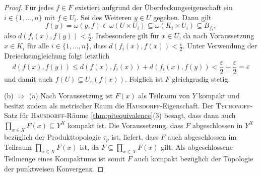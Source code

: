 \begin{proof}
  Für jedes $f \in F$ existiert aufgrund der Überdeckungseigenschaft ein $i \in \{ 1,\dots,n\}$ mit $f \in U_i$.
  Sei des Weiteren $y \in U$ gegeben.
  Dann gilt
  \begin{displaymath}
    f(y) = \omega(y,f) \in \omega(U \times U_i) \subseteq \omega(K_i \times U_i) \subseteq B_{f_i},
  \end{displaymath}
  also $d(f_i(x),f(y)) < \tfrac{\varepsilon}{2}$.
  Insbesondere gilt für $x \in U$, da nach Voraussetzung $x \in K_i$ für alle $i \in \{ 1,\dots,n\}$, dass $d(f_i(x),f(x)) < \tfrac{\varepsilon}{2}$.
  Unter Verwendung der Dreiecksungleichung folgt letztlich
  \begin{displaymath}
    d(f(x),f(y)) \leq d(f(x),f_i(x)) + d(f_i(x),f(y)) < \frac{\varepsilon}{2} + \frac{\varepsilon}{2} = \varepsilon
  \end{displaymath}
  und damit auch $f(U) \subseteq U_\varepsilon(f(x))$.
  Folglich ist $F$ gleichgradig stetig.

  (b) $\Rightarrow$ (a)
  Nach Voraussetzung ist $F(x)$ als Teilraum von $Y$ kompakt und besitzt zudem als metrischer Raum die \textsc{Hausdorff}\hyp{}Eigenschaft.
  Der \textsc{Tychonoff}\hyp{}Satz für \textsc{Hausdorff}\hyp{}Räume \ref{thm:pitequivalence}(3) besagt, dass dann auch $\prod_{x \in X} F(x) \subseteq Y^X$ kompakt ist.
  Die Voraussetzung, dass $F$ abgeschlossen in $Y^X$ bezüglich der Produkttopologie $\tau_p$ ist, liefert, dass $F$ auch abgeschlossen im Teilraum $\prod_{x \in X} F(x)$ ist, da $F \subseteq \prod_{x \in X} F(x)$ gilt.
  Als abgeschlossene Teilmenge eines Kompaktums ist somit $F$ auch kompakt bezüglich der Topologie der punktweisen Konvergenz.


\end{proof}
